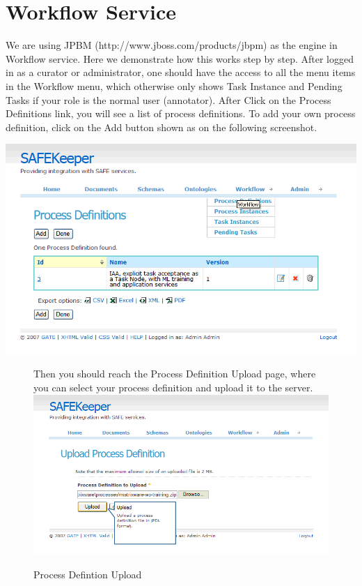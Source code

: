 \section{Workflow Service}
We are using JPBM (http://www.jboss.com/products/jbpm) as the engine in Workflow
service. Here we demonstrate how this works step by step.
\newline
\newline
After logged in as a curator or administrator, one should have the access to
all the menu items in the Workflow menu, which otherwise only shows Task
Instance and Pending Tasks if your role is the normal user (annotator). After
Click on the Process Definitions link, you will see a list of process
definitions. To add your own process definition, click on the Add button shown
as on the following screenshot.
\begin{center}
\includegraphics[scale=0.4]{processdefinitionlist}
\end{center}

\begin{figure}[htb]
Then you should reach the Process Definition Upload page, where
you can select your process definition and upload it to the server.
\newline
\newline
\includegraphics[scale=0.4]{uploadprocessdefinition}
\caption{Process Defintion Upload}
\label{fig:uploadprocessdefintion}
\end{figure}


